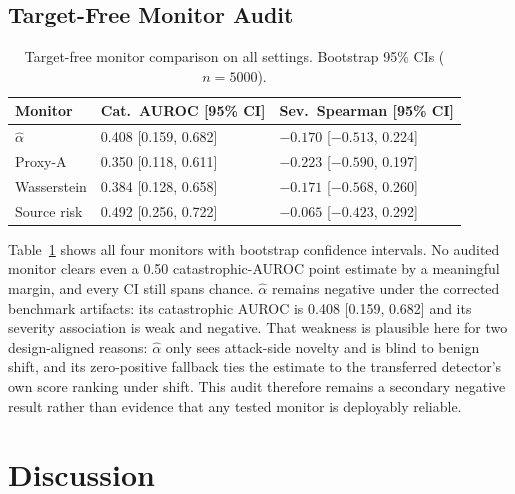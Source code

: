 \documentclass[10pt,conference]{IEEEtran}
\begin{document}
\FloatBarrier

\subsection{Target-Free Monitor Audit}
\label{sec:monitor-results}

\begin{table}[t]
\centering
\footnotesize
\caption{Target-free monitor comparison on all \NaturalSettingCount{} settings. Bootstrap 95\% CIs ($n{=}5000$).}
\label{tab:monitor}
\begin{tabular}{lll}
\toprule
Monitor & Cat.\ AUROC [95\% CI] & Sev.\ Spearman [95\% CI] \\
\midrule
$\hat{\alpha}$ & 0.408 [0.159, 0.682] & $-0.170$ [$-0.513$, 0.224] \\
Proxy-A & 0.350 [0.118, 0.611] & $-0.223$ [$-0.590$, 0.197] \\
Wasserstein & 0.384 [0.128, 0.658] & $-0.171$ [$-0.568$, 0.260] \\
Source risk & 0.492 [0.256, 0.722] & $-0.065$ [$-0.423$, 0.292] \\
\bottomrule
\end{tabular}
\end{table}

Table~\ref{tab:monitor} shows all four monitors with bootstrap confidence intervals. No audited monitor clears even a 0.50 catastrophic-AUROC point estimate by a meaningful margin, and every CI still spans chance. $\hat{\alpha}$ remains negative under the corrected benchmark artifacts: its catastrophic AUROC is 0.408 [0.159, 0.682] and its severity association is weak and negative. That weakness is plausible here for two design-aligned reasons: $\hat{\alpha}$ only sees attack-side novelty and is blind to benign shift, and its zero-positive fallback ties the estimate to the transferred detector's own score ranking under shift. This audit therefore remains a secondary negative result rather than evidence that any tested monitor is deployably reliable.

\section{Discussion}
\end{document}
